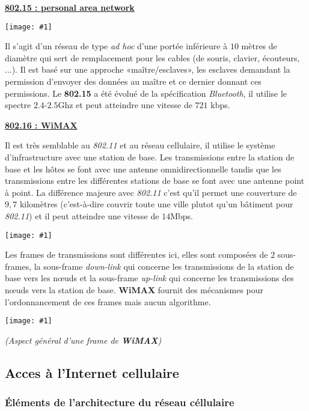\documentclass{article}
\newcommand{\imgR}[2]{\begin{center}\texttt{[image: \#1]}\end{center}}
\newcommand{\stitre}[1]{\noindent\textbf{\underline{#1}} \\}
\newcommand{\neuSPs}{n\oe uds }
\begin{document}
\stitre{802.15 : personal area network}

\begin{multicols}{2}
\imgR{CN_157.png}{225}
Il s'agit d'un réseau de type \textit{ad hoc} d'une portée inférieure à $10$ mètres de diamètre qui sert de 
remplacement pour les cables (de souris, clavier, écouteurs, ...). Il est basé sur une approche 
«maître/esclaves», les esclaves demandant la permission d'envoyer des données au maître et ce dernier donnant ces 
permissions. Le \textbf{802.15} a été évolué de la spécification \textit{Bluetooth}, il utilise le spectre 
$2.4$-$2.5$Ghz et peut atteindre une vitesse de $721$ kbps.
\end{multicols}
\newpage
\stitre{802.16 : WiMAX}

\begin{multicols}{2}
Il est très semblable au \textit{802.11} et au réseau cellulaire, il utilise le système d'infrastructure avec une 
station de base. Les transmissions entre la station de base et les hôtes se font avec une antenne 
omnidirectionnelle tandis que les transmissions entre les différentes stations de base se font avec une antenne 
point à point. La différence majeure avec \textit{802.11} c'est qu'il permet une couverture de $9,7$ kilomètres 
(c'est-à-dire couvrir toute une ville plutot qu'un bâtiment pour \textit{802.11}) et il peut atteindre une 
vitesse de $14$Mbps.
\imgR{CN_158.png}{275}
\end{multicols}

Les frames de transmissions sont différentes ici, elles sont composées de $2$ sous-frames, la sous-frame 
\textit{down-link} qui concerne les transmissions de la station de base vers les \neuSPs et la sous-frame 
\textit{up-link} qui concerne les transmissions des \neuSPs vers la station de base. \textbf{WiMAX} fournit des 
mécanismes pour l'ordonnancement de ces frames mais aucun algorithme.
\imgR{CN_159.png}{300}
\begin{center}\textit{(Aspect général d'une frame de \textbf{WiMAX})}\end{center}

\subsection{Acces à l'Internet cellulaire}

\subsubsection{\'{E}léments de l'architecture du réseau céllulaire}
\end{document}
